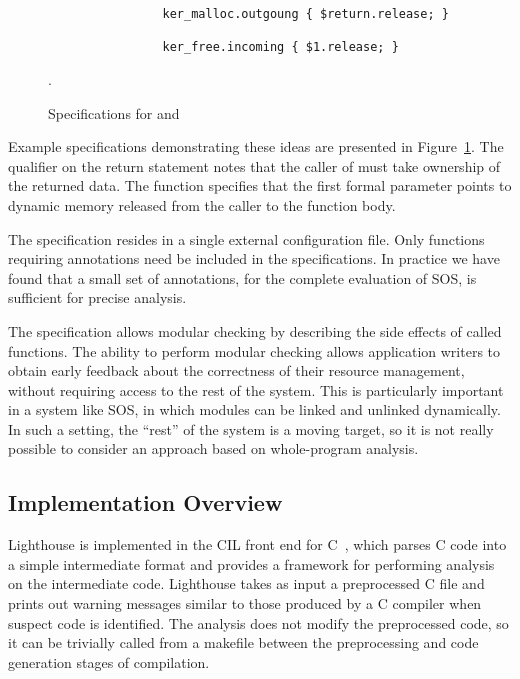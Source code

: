 \begin{figure}[tp]
\centering
\lstset{numbers=none, language=C}
\begin{lstlisting}
                ker_malloc.outgoung { $return.release; }

                ker_free.incoming { $1.release; }
\end{lstlisting}
\caption{\label{fig:spec}Specifications for  and
}.
\end{figure}



Example specifications demonstrating these ideas are presented in
Figure~\ref{fig:spec}.
%
The  qualifier on the  return statement notes
that the caller of  must take ownership of the returned
data.
%
The  function specifies that the  first formal
parameter points to dynamic memory released from the caller to the function
body.



The specification resides in a single external configuration file.
%
Only functions requiring annotations need be included in the specifications.
%
In practice we have found that a small set of annotations, \numannote for
the complete evaluation of SOS, is sufficient for precise analysis. 



The specification allows modular checking by describing the side effects of
called functions.
%
The ability to perform modular checking allows application writers to obtain
early feedback about the correctness of their resource management, without
requiring access to the rest of the system.  
%
This is particularly important in a system like SOS, in which modules can be
linked and unlinked dynamically.  
%
In such a setting, the ``rest'' of the system is a moving target, so it is not
really possible to consider an approach based on whole-program analysis.



\subsection{Implementation Overview}



Lighthouse is implemented in the CIL front end for C~\cite{CIL}, which
parses C code into a simple intermediate format and provides a framework for
performing analysis on the intermediate code. 
%
Lighthouse takes as input a preprocessed C file and prints out warning
messages similar to those produced by a C compiler when suspect code is
identified.
%
The analysis does not modify the preprocessed code, so it can be trivially
called from a makefile between the preprocessing and code generation stages
of compilation.



